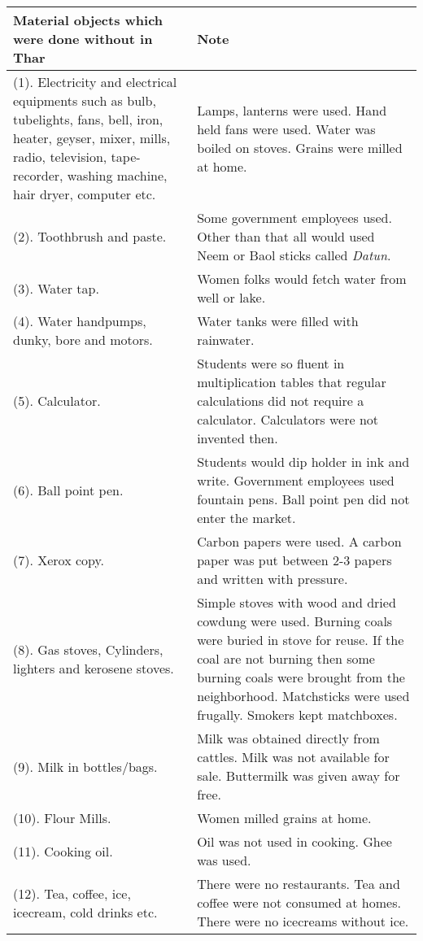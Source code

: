 \begin{center}
\hspace*{-2cm}\begin{longtable}{p{5cm}|p{10cm}}
\hline
\textbf{Material objects which were done without in Thar} &
\textbf{Note} \\
\hline
(1). Electricity and electrical equipments such as bulb, tubelights, fans, bell, iron, heater, geyser, mixer, mills, radio, television, tape-recorder, washing machine, hair dryer, computer etc. &
Lamps, lanterns were used. Hand held fans were used. Water was boiled on stoves. Grains were milled at home.\\
\hline
(2). Toothbrush and paste. &
Some government employees used. Other than that all would used Neem or Baol sticks called \textit{Datun}.\\
\hline
(3). Water tap. &
Women folks would fetch water from well or lake.\\
\hline
(4). Water handpumps, dunky, bore and motors. &
Water tanks were filled with rainwater.\\
\hline
(5). Calculator. &
Students were so fluent in multiplication tables that regular calculations did not require a calculator. Calculators were not invented then.\\
\hline
(6). Ball point pen. &
Students would dip holder in ink and write. Government employees used fountain pens. Ball point pen did not enter the market.\\
\hline
(7). Xerox copy. &
Carbon papers were used. A carbon paper was put between 2-3 papers and written with pressure.\\
\hline
(8). Gas stoves, Cylinders, lighters and kerosene stoves. &
Simple stoves with wood and dried cowdung were used. Burning coals were buried in stove for reuse. If the coal are not burning then some burning coals were brought from the neighborhood. Matchsticks were used frugally. Smokers kept matchboxes.\\
\hline
(9). Milk in bottles/bags. &
Milk was obtained directly from cattles. Milk was not available for sale. Buttermilk was given away for free.\\
\hline
(10). Flour Mills. &
Women milled grains at home.\\
\hline
(11). Cooking oil. &
Oil was not used in cooking. Ghee was used.\\
\hline
(12). Tea, coffee, ice, icecream, cold drinks etc. &
There were no restaurants. Tea and coffee were not consumed at homes. There were no icecreams without ice.\\

\end{longtable}
\end{center}
